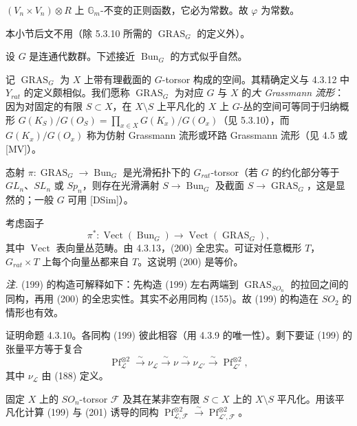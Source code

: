 $(V_{n}\times V_{n})\otimes R$ 上 $\mathbb{G}_{m}$-不变的正则函数，它必为常数。故 $\varphi$ 为常数。

 本小节后文不用（除 5.3.10 所需的 $\operatorname{GRAS}_{G}$ 的定义外）。

设 $G$ 是连通代数群。下述接近 $\operatorname{Bun}_{G}$ 的方式似乎自然。

记 $\operatorname{GRAS}_{G}$ 为 $X$ 上带有理截面的 $G$-torsor 构成的空间。其精确定义与 4.3.12 中 $Y_{rat}$ 的定义颇相似。我们愿称 $\operatorname{GRAS}_{G}$ 为对应 $G$ 与 $X$ 的\emph{大 Grassmann 流形}：因为对固定的有限 $S\subset X$，在 $X\setminus S$ 上平凡化的 $X$ 上 $G$-丛的空间可等同于归纳概形 $G(K_{S})/G(O_{S})=\prod_{x\in X}G(K_{x})/G(O_{x})$（见 5.3.10），而 $G(K_{x})/G(O_{x})$ 称为仿射 Grassmann 流形或环路 Grassmann 流形（见 4.5 或 [MV]）。

态射 $\pi:\operatorname{GRAS}_{G}\to\operatorname{Bun}_{G}$ 是光滑拓扑下的 $G_{rat}$-torsor（若 $G$ 的约化部分等于 $GL_{n}$、$SL_{n}$ 或 $Sp_{n}$，则存在光滑满射 $S\to\operatorname{Bun}_{G}$ 及截面 $S\to\operatorname{GRAS}_{G}$，这是显然的；一般 $G$ 可用 [DSim]）。

考虑函子
\begin{equation}\tag{200}
\pi^{*}:\operatorname{Vect}(\operatorname{Bun}_{G})\to\operatorname{Vect}(\operatorname{GRAS}_{G}),
\end{equation}
其中 $\operatorname{Vect}$ 表向量丛范畴。由 4.3.13，(200) 全忠实。可证对任意概形 $T$，$G_{rat}\times T$ 上每个向量丛都来自 $T$。这说明 (200) 是等价。

\emph{注.} (199) 的构造可解释如下：先构造 (199) 左右两端到 $\operatorname{GRAS}_{SO_{n}}$ 的拉回之间的同构，再用 (200) 的全忠实性。其实不必用同构 (155)。故 (199) 的构造在 $SO_{2}$ 的情形也有效。

 证明命题 4.3.10。各同构 (199) 彼此相容（用 4.3.9 的唯一性）。剩下要证 (199) 的张量平方等于复合
\begin{equation}\tag{201}
\operatorname{Pf}_{\mathcal{L}}^{\otimes 2}\xrightarrow{\ \sim\ }\nu_{\mathcal{L}}\xrightarrow{\ \sim\ }\nu\xrightarrow{\ \sim\ }\nu_{\mathcal{L}'}\xrightarrow{\ \sim\ }\operatorname{Pf}_{\mathcal{L}'}^{\otimes 2},
\end{equation}
其中 $\nu_{\mathcal{L}}$ 由 (188) 定义。

固定 $X$ 上的 $SO_{n}$-torsor $\mathcal{F}$ 及其在某非空有限 $S\subset X$ 上的 $X\setminus S$ 平凡化。用该平凡化计算 (199) 与 (201) 诱导的同构 $\operatorname{Pf}_{\mathcal{L},\mathcal{F}}^{\otimes 2}\xrightarrow{\ \sim\ }\operatorname{Pf}_{\mathcal{L}',\mathcal{F}}^{\otimes 2}$。


